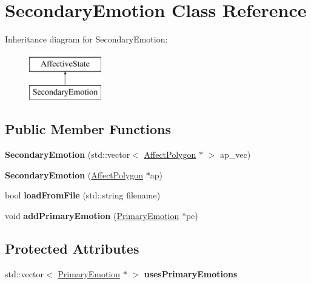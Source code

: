 \hypertarget{class_secondary_emotion}{
\section{\-Secondary\-Emotion \-Class \-Reference}
\label{class_secondary_emotion}
}
\-Inheritance diagram for \-Secondary\-Emotion\-:\begin{figure}[H]
\begin{center}
\leavevmode
\includegraphics[height=2.000000cm]{class_secondary_emotion}
\end{center}
\end{figure}
\subsection*{\-Public \-Member \-Functions}
\begin{DoxyCompactItemize}
\item 
\hypertarget{class_secondary_emotion_a28d618dbf5942bede4212aa865ad5584}{
{\bfseries \-Secondary\-Emotion} (std\-::vector$<$ \hyperlink{class_affect_polygon}{\-Affect\-Polygon} $\ast$ $>$ ap\-\_\-vec)}
\label{class_secondary_emotion_a28d618dbf5942bede4212aa865ad5584}

\item 
\hypertarget{class_secondary_emotion_afccda0194ecd624c80431086edbf585d}{
{\bfseries \-Secondary\-Emotion} (\hyperlink{class_affect_polygon}{\-Affect\-Polygon} $\ast$ap)}
\label{class_secondary_emotion_afccda0194ecd624c80431086edbf585d}

\item 
\hypertarget{class_secondary_emotion_ae66a9c880c5b443ff0c8ca2157811ea9}{
bool {\bfseries load\-From\-File} (std\-::string filename)}
\label{class_secondary_emotion_ae66a9c880c5b443ff0c8ca2157811ea9}

\item 
\hypertarget{class_secondary_emotion_a048337e8bf8c3a8ccc8caf68ac7d4783}{
void {\bfseries add\-Primary\-Emotion} (\hyperlink{class_primary_emotion}{\-Primary\-Emotion} $\ast$pe)}
\label{class_secondary_emotion_a048337e8bf8c3a8ccc8caf68ac7d4783}

\end{DoxyCompactItemize}
\subsection*{\-Protected \-Attributes}
\begin{DoxyCompactItemize}
\item 
\hypertarget{class_secondary_emotion_a9715b0f8a820b8d190ce097c31750388}{
std\-::vector$<$ \hyperlink{class_primary_emotion}{\-Primary\-Emotion} $\ast$ $>$ {\bfseries uses\-Primary\-Emotions}}
\label{class_secondary_emotion_a9715b0f8a820b8d190ce097c31750388}

\end{DoxyCompactItemize}


